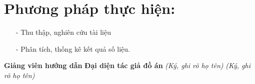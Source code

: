\documentclass[12pt,a4paper]{article}
\begin{document}
\section{Phương pháp thực hiện:}
	\begin{enumerate}
		\item[-] Thu thập, nghiên cứu tài liệu
		\item[-] Phân tích, thống kê kết quả số liệu.
	\end{enumerate}
	
\hspace{75pt}
\textbf{Giảng viên hướng dẫn}
\hspace{100pt} \textbf{Đại diện tác giả đồ án}
\newline
\hspace*{88pt} \textit{(Ký, ghi rõ họ tên)}
\hspace{125pt} \textit{(Ký, ghi rõ họ tên)}
\end{document}
